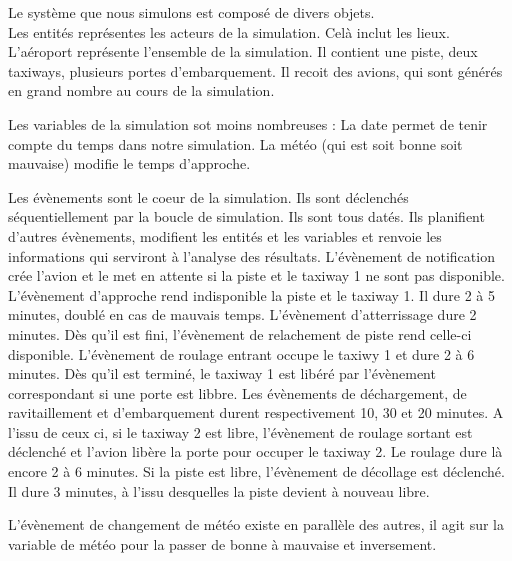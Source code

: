 Le système que nous simulons est composé de divers objets. \\

Les entités représentes les acteurs de la simulation. Celà inclut les lieux.
  L'aéroport représente l'ensemble de la simulation. Il contient une piste, deux taxiways, plusieurs portes d'embarquement. Il recoit des avions, qui sont générés en grand nombre au cours de la simulation.
  
Les variables de la simulation sot moins nombreuses : La date permet de tenir compte du temps dans notre simulation. La météo (qui est soit bonne soit mauvaise) modifie le temps d'approche.
  
Les évènements sont le coeur de la simulation. Ils sont déclenchés séquentiellement par la boucle de simulation. Ils sont tous datés. Ils planifient d'autres évènements, modifient les entités et les variables et renvoie les informations qui serviront à l'analyse des résultats.
L'évènement de notification crée l'avion et le met en attente si la piste et le taxiway 1 ne sont pas disponible.
L'évènement d'approche rend indisponible la piste et le taxiway 1. Il dure 2 à 5 minutes, doublé en cas de mauvais temps.
L'évènement d'atterrissage dure 2 minutes. Dès qu'il est fini, l'évènement de relachement de piste rend celle-ci disponible.
L'évènement de roulage entrant occupe le taxiwy 1 et dure 2 à 6 minutes. Dès qu'il est terminé, le taxiway 1 est libéré par l'évènement correspondant si une porte est libbre. 
Les évènements de déchargement, de ravitaillement et d'embarquement durent respectivement 10, 30 et 20 minutes.
A l'issu de ceux ci, si le taxiway 2 est libre, l'évènement de roulage sortant est déclenché et l'avion libère la porte pour occuper le taxiway 2. Le roulage dure là encore 2 à 6 minutes.
Si la piste est libre, l'évènement de décollage est déclenché. Il dure 3 minutes, à l'issu desquelles la piste devient à nouveau libre.

L'évènement de changement de météo existe en parallèle des autres, il agit sur la variable de météo pour la passer de bonne à mauvaise et inversement.
